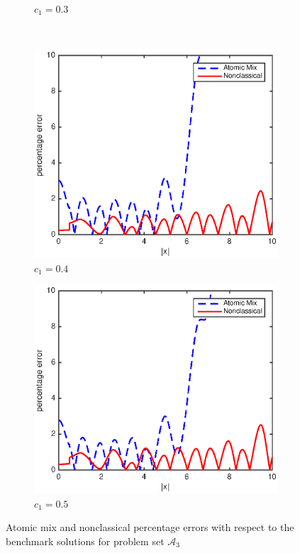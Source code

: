\documentclass[12pt]{article}
\newcommand{\seta}{\mathcal{A}}
\begin{document}
{\begin{figure}[p]
\begin{subfigure}{0.495\textwidth}
        \caption{$c_1 = 0.3$}
        \label{figerrC30}
    \end{subfigure}
    \\
    \centering
    \begin{subfigure}{0.495\textwidth}
        \centering
        \includegraphics[width=\textwidth]{NSE_err_C40.eps}
        \caption{$c_1 = 0.4$}
        \label{figerrC40}
    \end{subfigure}
    \hfill
    \begin{subfigure}{0.495\textwidth}
        \centering
        \includegraphics[width=\textwidth]{NSE_err_C50.eps}
        \caption{$c_1 = 0.5$}
        \label{figerrC50}
    \end{subfigure}
    \caption{Atomic mix and nonclassical percentage errors with respect to the benchmark solutions for problem set $\seta_3$}
    \label{figerrC1}
\end{figure}





}
\end{document}
